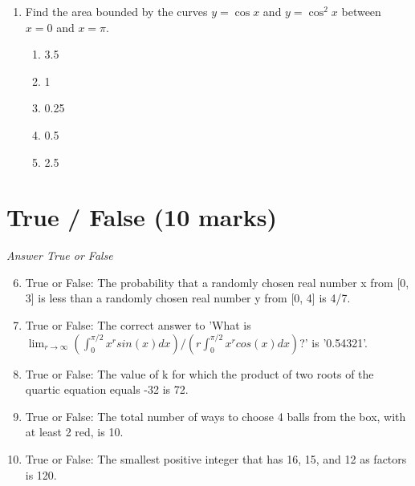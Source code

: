 \documentclass[12pt]{article}
\begin{document}
\begin{enumerate}[label=\arabic*.]
\begin{enumerate}[label=(\alph*)]
    \item 13 in.
    \item 10 in.
    \item 11 in.
    \item 45.0 in.
    \item 15 in.
\end{enumerate}
\item Find the area bounded by the curves $y=\cos x$ and $y=\cos ^2 x$ between $x=0$ and $x=\pi$.
\begin{enumerate}[label=(\alph*)]
    \item 3.5
    \item 1
    \item 0.25
    \item 0.5
    \item 2.5
\end{enumerate}
\end{enumerate}

\section*{True / False (10 marks)}
\textit{Answer True or False}
\begin{enumerate}[label=\arabic*.]
\setcounter{enumi}{5}
\item True or False: The probability that a randomly chosen real number x from [0, 3] is less than a randomly chosen real number y from [0, 4] is 4/7.
\item True or False: The correct answer to 'What is $\lim _{r \rightarrow \infty} (\int_0^{\pi/2} x^r sin(x) dx)/(r\int_0^{\pi/2} x^r cos(x) dx)$?' is '0.54321'.
\item True or False: The value of k for which the product of two roots of the quartic equation equals -32 is 72.
\item True or False: The total number of ways to choose 4 balls from the box, with at least 2 red, is 10.
\item True or False: The smallest positive integer that has 16, 15, and 12 as factors is 120.
\end{enumerate}
\end{document}
